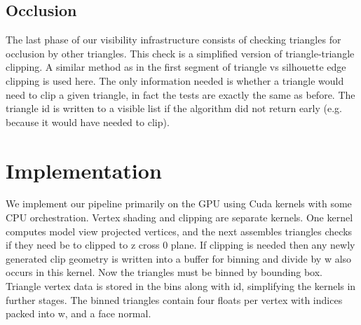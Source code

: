 \documentclass[review]{acmsiggraph}
\begin{document}
\subsection{Occlusion}

	The last phase of our visibility infrastructure consists of checking triangles for occlusion by other triangles. This check is a simplified version of triangle-triangle clipping. A similar method as in the first segment of triangle vs silhouette edge clipping is used here. The only information needed is whether a triangle would need to clip a given triangle, in fact the tests are exactly the same as before. The triangle id is written to a visible list if the algorithm did not return early (e.g. because it would have needed to clip).

\section{Implementation}
We implement our pipeline primarily on the GPU using Cuda kernels with some CPU orchestration. Vertex shading and clipping are separate kernels. One kernel computes model view projected vertices, and the next assembles triangles checks if they need be to clipped to z cross 0 plane. If clipping is needed then any newly generated clip geometry is written into a buffer for binning and divide by w also occurs in this kernel. Now the triangles must be binned by bounding box. Triangle vertex data is stored in the bins along with id, simplifying the kernels in further stages. The binned triangles contain four floats per vertex with indices packed into w, and a face normal.
\end{document}

